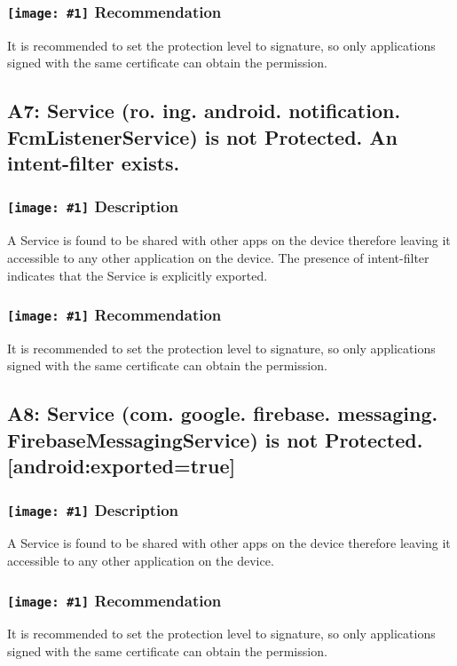 \documentclass[12p]{article}
\newcommand{\icon}[1]{\texttt{[image: \#1]}}
\begin{document}
\subsubsection*{\protect\icon{/home/miki/Documents/GITHUB/AndroidPermissions/python/vulns/report_icons/basic_todo.png} Recommendation}
It is recommended to set the protection level to signature, so only applications signed with the same certificate can obtain the permission.
\subsection{A7: Service (ro. ing. android. notification. FcmListenerService) is not Protected. An intent-filter exists.}
\subsubsection*{\protect\icon{/home/miki/Documents/GITHUB/AndroidPermissions/python/vulns/report_icons/basic_sheet.png} Description}
A  Service is found to be shared with other apps on the device therefore leaving it accessible to any other application on the device. The presence of intent-filter indicates that the Service is explicitly exported.
\subsubsection*{\protect\icon{/home/miki/Documents/GITHUB/AndroidPermissions/python/vulns/report_icons/basic_todo.png} Recommendation}
It is recommended to set the protection level to signature, so only applications signed with the same certificate can obtain the permission.
\subsection{A8: Service (com. google. firebase. messaging. FirebaseMessagingService) is not Protected. [android:exported=true]}
\subsubsection*{\protect\icon{/home/miki/Documents/GITHUB/AndroidPermissions/python/vulns/report_icons/basic_sheet.png} Description}
A Service is found to be shared with other apps on the device therefore leaving it accessible to any other application on the device.
\subsubsection*{\protect\icon{/home/miki/Documents/GITHUB/AndroidPermissions/python/vulns/report_icons/basic_todo.png} Recommendation}
It is recommended to set the protection level to signature, so only applications signed with the same certificate can obtain the permission.
\end{document}
